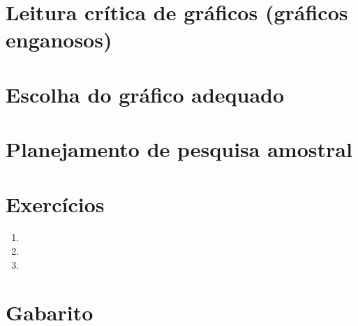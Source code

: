 \documentclass[11pt,a4paper]{article}
\begin{document}
\section{Leitura crítica de gráficos (gráficos enganosos)}

\section{Escolha do gráfico adequado}

\section{Planejamento de pesquisa amostral}


\section{Exercícios}
\begin{enumerate}[label=\textbf{\arabic*.}]
  \item %
  \item %
  \item %
\end{enumerate}

\begin{desafio}
\end{desafio}

\section*{Gabarito}
\end{document}
